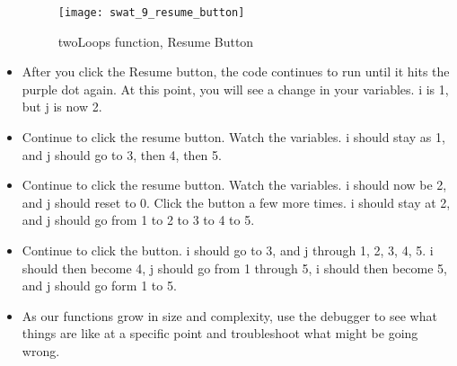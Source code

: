 \documentclass{article}
\begin{document}
\begin{itemize}
	\begin{figure}[H]
  		\centering
  		\texttt{[image: swat\_9\_resume\_button]}
  		\caption{twoLoops function, Resume Button}
	\end{figure}
	\item After you click the Resume button, the code continues to run until it hits the purple dot again.  At this point, you will see a change in your variables.  i is 1, but j is now 2.
	\item Continue to click the resume button.  Watch the variables.  i should stay as 1, and j should go to 3, then 4, then 5.
	\item Continue to click the resume button.  Watch the variables.  i should now be 2, and j should reset to 0.  Click the button a few more times.  i should stay at 2, and j should go from 1 to 2 to 3 to 4 to 5.
	\item Continue to click the button.  i should go to 3, and j through 1, 2, 3, 4, 5. i should then become 4, j should go from 1 through 5, i should then become 5, and j should go form 1 to 5.
	\item As our functions grow in size and complexity, use the debugger to see what things are like at a specific point and troubleshoot what might be going wrong.
\end{itemize}
\end{document}
